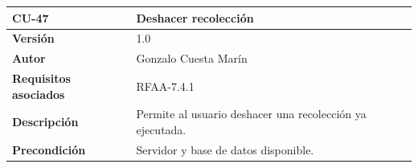 \documentclass[
]{article}
\begin{document}
\begin{longtable}[]{@{}ll@{}}
\toprule
\begin{minipage}[b]{0.25\columnwidth}\raggedright
\textbf{CU-47}\strut
\end{minipage} & \begin{minipage}[b]{0.69\columnwidth}\raggedright
\textbf{Deshacer recolección}\strut
\end{minipage}\tabularnewline
\midrule
\endhead
\begin{minipage}[t]{0.25\columnwidth}\raggedright
\textbf{Versión}\strut
\end{minipage} & \begin{minipage}[t]{0.69\columnwidth}\raggedright
1.0\strut
\end{minipage}\tabularnewline
\begin{minipage}[t]{0.25\columnwidth}\raggedright
\textbf{Autor}\strut
\end{minipage} & \begin{minipage}[t]{0.69\columnwidth}\raggedright
Gonzalo Cuesta Marín\strut
\end{minipage}\tabularnewline
\begin{minipage}[t]{0.25\columnwidth}\raggedright
\textbf{Requisitos asociados}\strut
\end{minipage} & \begin{minipage}[t]{0.69\columnwidth}\raggedright
RFAA-7.4.1\strut
\end{minipage}\tabularnewline
\begin{minipage}[t]{0.25\columnwidth}\raggedright
\textbf{Descripción}\strut
\end{minipage} & \begin{minipage}[t]{0.69\columnwidth}\raggedright
Permite al usuario deshacer una recolección ya ejecutada.\strut
\end{minipage}\tabularnewline
\begin{minipage}[t]{0.25\columnwidth}\raggedright
\textbf{Precondición}\strut
\end{minipage} & \begin{minipage}[t]{0.69\columnwidth}\raggedright
Servidor y base de datos disponible.


\end{minipage}
\end{longtable}
\end{document}
